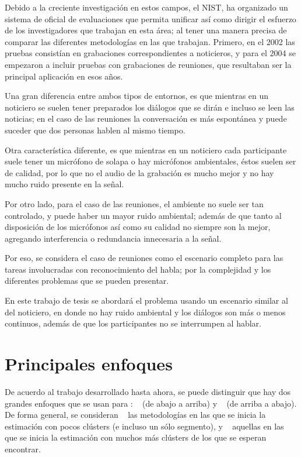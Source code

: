 Debido a la creciente investigación en estos campos, el \ac{NIST}, ha organizado un sistema de oficial de evaluaciones que permita  unificar así como dirigir el esfuerzo de los investigadores que trabajan en esta área; al tener una manera precisa de comparar las diferentes metodologías en las que trabajan. Primero, en el 2002 las pruebas consistían en grabaciones correspondientes a noticieros, y para el 2004 se empezaron a incluir pruebas con grabaciones de reuniones, que resultaban ser la principal aplicación en esos años.

Una gran diferencia entre ambos tipos de entornos, es que mientras en un noticiero se suelen tener preparados los diálogos que se dirán e incluso se leen las noticias; en el caso de las reuniones la conversación es más espontánea y puede suceder que dos personas hablen al mismo tiempo. 

Otra característica diferente, es que mientras en un noticiero cada participante suele tener un micrófono de solapa o hay micrófonos ambientales, éstos suelen ser de calidad, por lo que no el audio de la grabación es mucho mejor y no hay mucho ruido presente en la señal. 

Por otro lado, para el caso de las reuniones, el ambiente no suele ser tan controlado, y puede haber un mayor ruido ambiental; además de que tanto al disposición de los micrófonos así como su calidad no siempre son la mejor, agregando interferencia o redundancia innecesaria a la señal.

Por eso, se considera el caso de reuniones como el escenario completo para las tareas involucradas con reconocimiento del habla; por la complejidad y los diferentes problemas que se pueden presentar.

En este trabajo de tesis se abordará el problema usando un escenario similar al del noticiero, en donde no hay ruido ambiental y los diálogos son más o menos continuos, además de que los participantes no se interrumpen al hablar.

\section{Principales enfoques}
\label{sec:previo}

De acuerdo al trabajo desarrollado hasta ahora, se puede distinguir que hay dos grandes enfoques que se usan para \sd: \bu~ (de abajo a arriba) y \td~ (de arriba a abajo). De forma general, se consideran \bu~ las metodologías en las que se inicia la estimación con pocos clústers (e incluso un sólo segmento), y \td~ aquellas en las que se inicia la estimación con muchos más clústers de los que se esperan encontrar.

